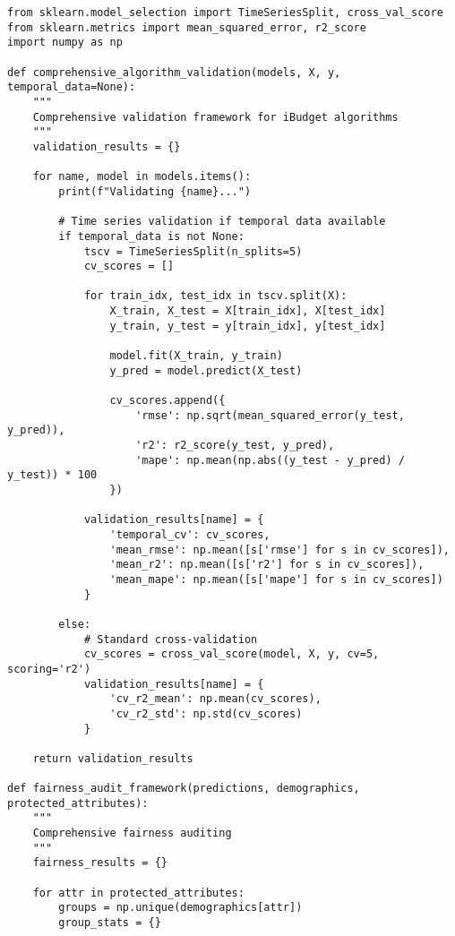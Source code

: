 \begin{lstlisting}
from sklearn.model_selection import TimeSeriesSplit, cross_val_score
from sklearn.metrics import mean_squared_error, r2_score
import numpy as np

def comprehensive_algorithm_validation(models, X, y, temporal_data=None):
    """
    Comprehensive validation framework for iBudget algorithms
    """
    validation_results = {}
    
    for name, model in models.items():
        print(f"Validating {name}...")
        
        # Time series validation if temporal data available
        if temporal_data is not None:
            tscv = TimeSeriesSplit(n_splits=5)
            cv_scores = []
            
            for train_idx, test_idx in tscv.split(X):
                X_train, X_test = X[train_idx], X[test_idx]
                y_train, y_test = y[train_idx], y[test_idx]
                
                model.fit(X_train, y_train)
                y_pred = model.predict(X_test)
                
                cv_scores.append({
                    'rmse': np.sqrt(mean_squared_error(y_test, y_pred)),
                    'r2': r2_score(y_test, y_pred),
                    'mape': np.mean(np.abs((y_test - y_pred) / y_test)) * 100
                })
            
            validation_results[name] = {
                'temporal_cv': cv_scores,
                'mean_rmse': np.mean([s['rmse'] for s in cv_scores]),
                'mean_r2': np.mean([s['r2'] for s in cv_scores]),
                'mean_mape': np.mean([s['mape'] for s in cv_scores])
            }
        
        else:
            # Standard cross-validation
            cv_scores = cross_val_score(model, X, y, cv=5, scoring='r2')
            validation_results[name] = {
                'cv_r2_mean': np.mean(cv_scores),
                'cv_r2_std': np.std(cv_scores)
            }
    
    return validation_results

def fairness_audit_framework(predictions, demographics, protected_attributes):
    """
    Comprehensive fairness auditing
    """
    fairness_results = {}
    
    for attr in protected_attributes:
        groups = np.unique(demographics[attr])
        group_stats = {}
        

\end{lstlisting}
